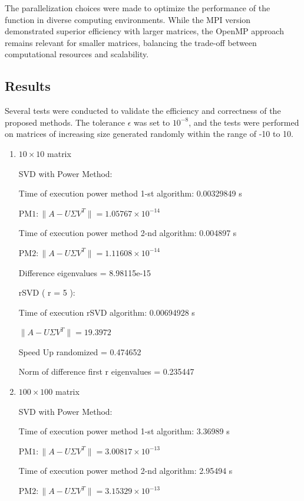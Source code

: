 \documentclass{article}
\begin{document}
The parallelization choices were made to optimize the performance of the function in diverse computing environments. While the MPI version demonstrated superior efficiency with larger matrices, the OpenMP approach remains relevant for smaller matrices, balancing the trade-off between computational resources and scalability.


\subsection{Results}
Several tests were conducted to validate the efficiency and correctness of the proposed methods. The tolerance \(\epsilon\) was set to \(10^{-8}\), and the tests were performed on matrices of increasing size generated randomly within the range of -10 to 10.

\begin{enumerate}
\item $10 \times 10$ matrix

SVD with Power Method:

Time of execution power method 1-st algorithm: 0.00329849 s

\( \text{PM1} : \| A - U \Sigma V^T \| = 1.05767 \times 10^{-14} \)

Time of execution power method 2-nd algorithm: 0.004897 s

\( \text{PM2} : \| A - U \Sigma V^T \| = 1.11608 \times 10^{-14} \)

Difference eigenvalues = 8.98115e-15

\vspace{\baselineskip}
rSVD ( r = 5 ):

Time of execution rSVD algorithm: 0.00694928 s

\(\| A - U \Sigma V^T \| = 19.3972 \)

Speed Up randomized = 0.474652

Norm of difference first r eigenvalues = 0.235447

\vspace{\baselineskip}
\item $100 \times 100$ matrix

SVD with Power Method:

Time of execution power method 1-st algorithm: 3.36989 s

\( \text{PM1} : \| A - U \Sigma V^T \| = 3.00817 \times 10^{-13} \)

Time of execution power method 2-nd algorithm: 2.95494 s

\( \text{PM2} : \| A - U \Sigma V^T \| = 3.15329 \times 10^{-13} \)


\end{enumerate}
\end{document}
